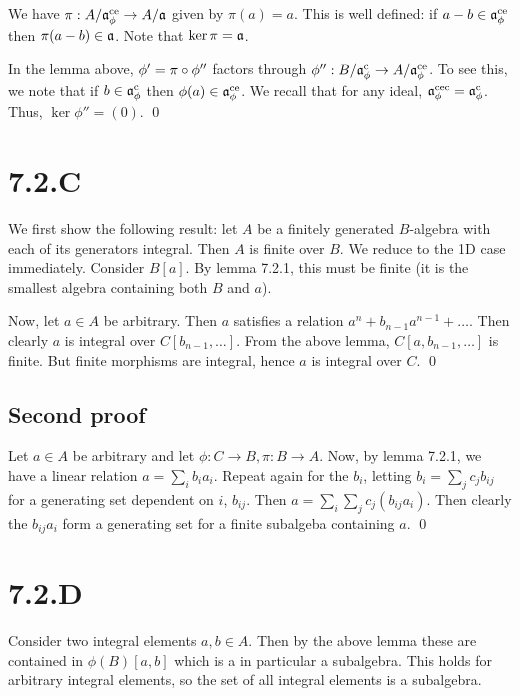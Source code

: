\documentclass{article}
\begin{document}
\begin{enumerate}[a.]
          We have $\pi: A/\mathfrak{a}^{\text{ce}}_{\phi} \to A/\mathfrak{a}$ given by $\pi(a)=a$. This is well
          defined: if $a-b \in \mathfrak{a}^{\text{ce}}_{\phi}$ then $\pi(a-b) \in \mathfrak{a}$. Note that
          $\ker \pi = \mathfrak{a}$.

          In the lemma above, $\phi' = \pi \circ \phi''$ factors through
          $\phi'': B/\mathfrak{a}^{\text{c}}_{\phi} \to A/\mathfrak{a}^{\text{ce}}_{\phi}$. To see this, we note that if $b \in \mathfrak{a}^{\text{c}}_{\phi}$
          then $\phi(a) \in
              \mathfrak{a}^{\text{ce}}_{\phi}$. We recall that for any ideal,
          $\mathfrak{a}^{\text{cec}}_{\phi}=\mathfrak{a}^{\text{c}}_{\phi}$. Thus, $\ker \phi'' =
              (0)$. \qed

\end{enumerate}

\section{7.2.C}
We first show the following result: let $A$ be a finitely
generated $B$-algebra with each of its generators integral.
Then $A$ is finite over $B$. We reduce
to the 1D case immediately. Consider $B[a]$. By lemma 7.2.1,
this must be finite (it is the smallest algebra containing both
$B$ and $a$).

Now, let $a \in A$ be arbitrary. Then $a$
satisfies a relation $a^n+b_{n-1}a^{n-1}+\dots$. Then clearly
$a$ is integral over $C[b_{n-1},\dots]$. From the
above lemma, $C[a, b_{n-1},\dots]$ is finite. But finite morphisms are
integral, hence $a$ is integral over
$C$. \qed

\subsection*{Second proof}

Let $a \in A$ be arbitrary and let $\phi: C \to B, \pi: B \to A$. Now,
by lemma 7.2.1, we have a linear relation $a=\sum_i b_ia_i$. Repeat again
for the $b_i$, letting $b_i=\sum_j c_jb_{ij}$ for a
generating set dependent on $i$, $b_{ij}$.
Then $a=\sum_i \sum_j c_j(b_{ij}a_i)$. Then clearly the $b_{ij}a_i$ form a
generating set for a finite subalgeba containing $a$. \qed

\section{7.2.D}
Consider two integral elements $a, b \in A$. Then by the above lemma
these are contained in $\phi(B)[a, b]$ which is a in particular a
subalgebra. This holds for arbitrary integral elements, so the set of all
integral elements is a subalgebra.
\end{document}
